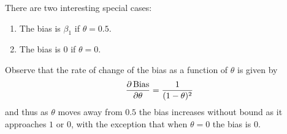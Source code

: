 \documentclass[
]{article}
\begin{document}
There are two interesting special cases:

\begin{enumerate}
\item The bias is $\beta_1$ if $\theta = 0.5$.
\item The bias is $0$ if $\theta = 0$.
\end{enumerate}

Observe that the rate of change of the bias as a function of \(\theta\)
is given by \[
   \frac{\partial \operatorname{Bias}}{\partial \theta} = \frac{1}{(1-\theta)^2}
\] and thus as \(\theta\) moves away from \(0.5\) the bias increases
without bound as it approaches \(1\) or \(0\), with the exception that
when \(\theta = 0\) the bias is \(0\).
\end{document}
